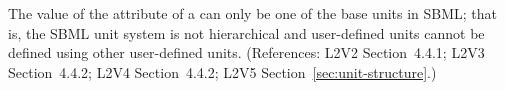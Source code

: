 The value of the  attribute of a \Unit can only be
one of the base units in SBML; that is, the SBML unit
system is not hierarchical and user-defined units cannot be defined using
other user-defined units.  (References: L2V2 Section~4.4.1;
L2V3 Section~4.4.2; L2V4 Section~4.4.2; L2V5 Section~\ref{sec:unit-structure}.)
